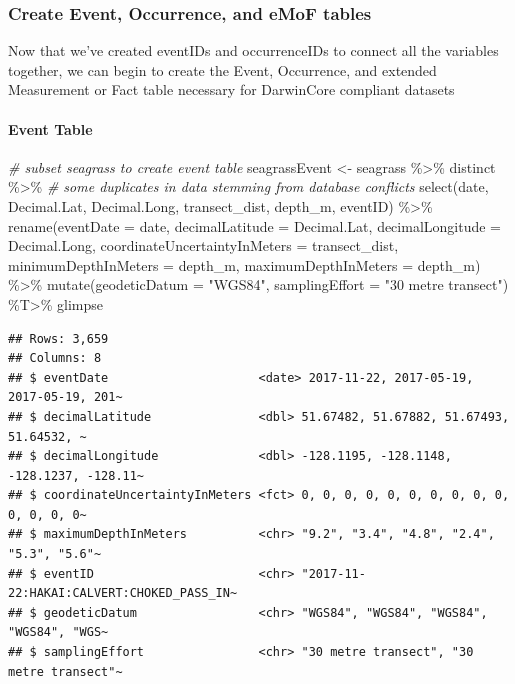 \documentclass[
]{book}
\newenvironment{Shaded}{\begin{snugshade}}{\end{snugshade}}
\newcommand{\AttributeTok}[1]{\textcolor[rgb]{0.77,0.63,0.00}{#1}}
\newcommand{\CommentTok}[1]{\textcolor[rgb]{0.56,0.35,0.01}{\textit{#1}}}
\newcommand{\FunctionTok}[1]{\textcolor[rgb]{0.00,0.00,0.00}{#1}}
\newcommand{\NormalTok}[1]{#1}
\newcommand{\OtherTok}[1]{\textcolor[rgb]{0.56,0.35,0.01}{#1}}
\newcommand{\SpecialCharTok}[1]{\textcolor[rgb]{0.00,0.00,0.00}{#1}}
\newcommand{\StringTok}[1]{\textcolor[rgb]{0.31,0.60,0.02}{#1}}
\begin{document}
\hypertarget{create-event-occurrence-and-emof-tables}{%
\subsubsection{Create Event, Occurrence, and eMoF tables}\label{create-event-occurrence-and-emof-tables}}

Now that we've created eventIDs and occurrenceIDs to connect all the
variables together, we can begin to create the Event, Occurrence,
and extended Measurement or Fact table necessary for DarwinCore
compliant datasets

\hypertarget{event-table}{%
\paragraph{Event Table}\label{event-table}}

\begin{Shaded}
\begin{Highlighting}[]
\CommentTok{\# subset seagrass to create event table}
\NormalTok{seagrassEvent }\OtherTok{\textless{}{-}}
\NormalTok{  seagrass }\SpecialCharTok{\%\textgreater{}\%}
\NormalTok{  distinct }\SpecialCharTok{\%\textgreater{}\%}  \CommentTok{\# some duplicates in data stemming from database conflicts}
  \FunctionTok{select}\NormalTok{(date,}
\NormalTok{         Decimal.Lat, Decimal.Long, transect\_dist,}
\NormalTok{         depth\_m, eventID) }\SpecialCharTok{\%\textgreater{}\%}
  \FunctionTok{rename}\NormalTok{(}\AttributeTok{eventDate                     =}\NormalTok{ date,}
         \AttributeTok{decimalLatitude               =}\NormalTok{ Decimal.Lat,}
         \AttributeTok{decimalLongitude              =}\NormalTok{ Decimal.Long,}
         \AttributeTok{coordinateUncertaintyInMeters =}\NormalTok{ transect\_dist,}
         \AttributeTok{minimumDepthInMeters          =}\NormalTok{ depth\_m,}
         \AttributeTok{maximumDepthInMeters          =}\NormalTok{ depth\_m) }\SpecialCharTok{\%\textgreater{}\%}
  \FunctionTok{mutate}\NormalTok{(}\AttributeTok{geodeticDatum  =} \StringTok{"WGS84"}\NormalTok{,}
         \AttributeTok{samplingEffort =} \StringTok{"30 metre transect"}\NormalTok{) }\SpecialCharTok{\%T\textgreater{}\%}\NormalTok{ glimpse}
\end{Highlighting}
\end{Shaded}

\begin{verbatim}
## Rows: 3,659
## Columns: 8
## $ eventDate                     <date> 2017-11-22, 2017-05-19, 2017-05-19, 201~
## $ decimalLatitude               <dbl> 51.67482, 51.67882, 51.67493, 51.64532, ~
## $ decimalLongitude              <dbl> -128.1195, -128.1148, -128.1237, -128.11~
## $ coordinateUncertaintyInMeters <fct> 0, 0, 0, 0, 0, 0, 0, 0, 0, 0, 0, 0, 0, 0~
## $ maximumDepthInMeters          <chr> "9.2", "3.4", "4.8", "2.4", "5.3", "5.6"~
## $ eventID                       <chr> "2017-11-22:HAKAI:CALVERT:CHOKED_PASS_IN~
## $ geodeticDatum                 <chr> "WGS84", "WGS84", "WGS84", "WGS84", "WGS~
## $ samplingEffort                <chr> "30 metre transect", "30 metre transect"~
\end{verbatim}
\end{document}
